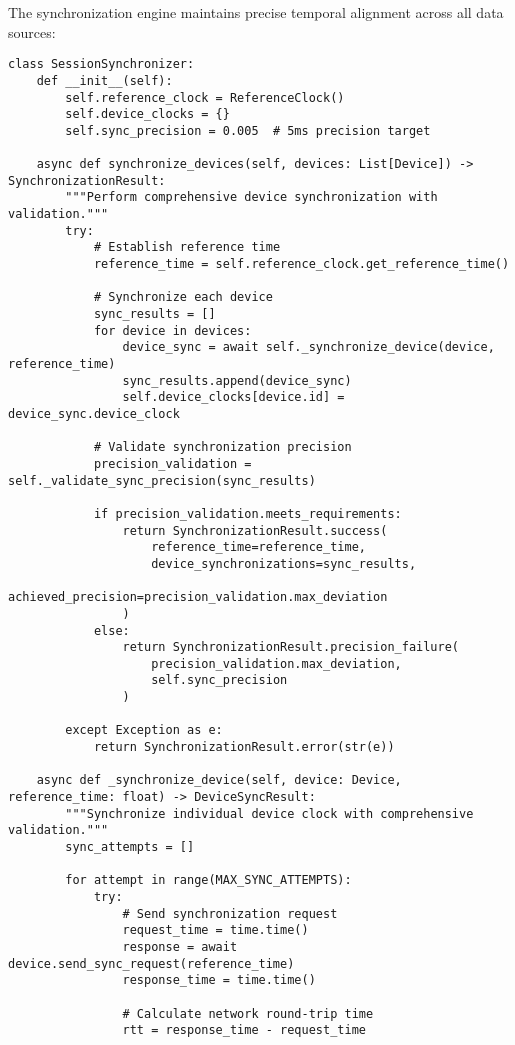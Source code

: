 \documentclass[12pt,a4paper]{report}
\begin{document}
The synchronization engine maintains precise temporal alignment across all data sources:

\begin{verbatim}
class SessionSynchronizer:
    def __init__(self):
        self.reference_clock = ReferenceClock()
        self.device_clocks = {}
        self.sync_precision = 0.005  # 5ms precision target

    async def synchronize_devices(self, devices: List[Device]) -> SynchronizationResult:
        """Perform comprehensive device synchronization with validation."""
        try:
            # Establish reference time
            reference_time = self.reference_clock.get_reference_time()

            # Synchronize each device
            sync_results = []
            for device in devices:
                device_sync = await self._synchronize_device(device, reference_time)
                sync_results.append(device_sync)
                self.device_clocks[device.id] = device_sync.device_clock

            # Validate synchronization precision
            precision_validation = self._validate_sync_precision(sync_results)

            if precision_validation.meets_requirements:
                return SynchronizationResult.success(
                    reference_time=reference_time,
                    device_synchronizations=sync_results,
                    achieved_precision=precision_validation.max_deviation
                )
            else:
                return SynchronizationResult.precision_failure(
                    precision_validation.max_deviation,
                    self.sync_precision
                )

        except Exception as e:
            return SynchronizationResult.error(str(e))

    async def _synchronize_device(self, device: Device, reference_time: float) -> DeviceSyncResult:
        """Synchronize individual device clock with comprehensive validation."""
        sync_attempts = []

        for attempt in range(MAX_SYNC_ATTEMPTS):
            try:
                # Send synchronization request
                request_time = time.time()
                response = await device.send_sync_request(reference_time)
                response_time = time.time()

                # Calculate network round-trip time
                rtt = response_time - request_time


\end{verbatim}
\end{document}
